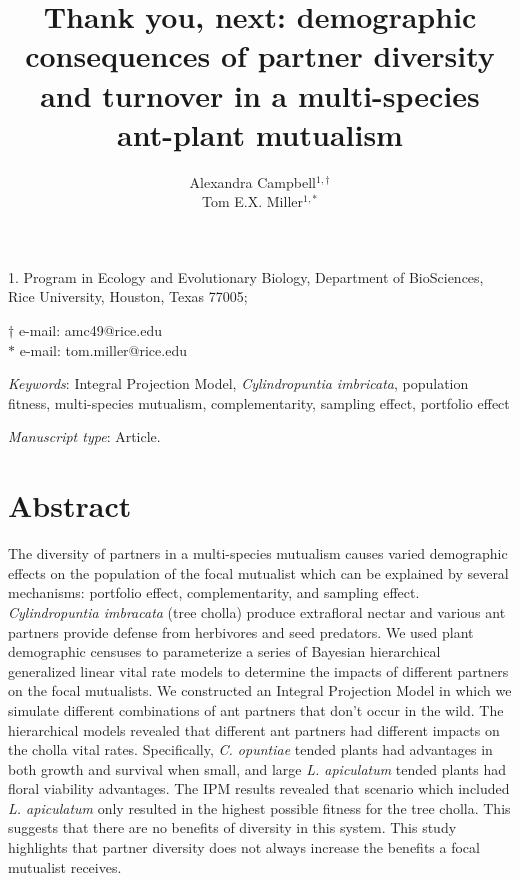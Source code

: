 \documentclass[11pt]{article}
\title{Thank you, next: demographic consequences of partner diversity and turnover in a multi-species ant-plant mutualism}
\author{Alexandra Campbell$^{1,\dagger}$ \\ 
	Tom E.X. Miller$^{1,\ast}$}
\date{}
\begin{document}
	
	\maketitle
	
	\noindent{} 1. Program in Ecology and Evolutionary Biology, Department of BioSciences, Rice University, Houston, Texas 77005;
	
	\noindent{} $\dagger$ e-mail: amc49@rice.edu\\
	\noindent{} $\ast$ e-mail: tom.miller@rice.edu
	
	\bigskip
	
	\textit{Keywords}:  Integral Projection Model, \textit{Cylindropuntia imbricata}, population fitness, multi-species mutualism, complementarity, sampling effect, portfolio effect
	
	\bigskip
	
	\textit{Manuscript type}: Article.
	
	\bigskip
	
	
\linenumbers{}
\modulolinenumbers[3]

\newpage{}

	\section*{Abstract}
The diversity of partners in a multi-species mutualism causes varied demographic effects on the population of the focal mutualist which can be explained by several mechanisms: portfolio effect, complementarity, and sampling effect.
\textit{Cylindropuntia imbracata} (tree cholla) produce extrafloral nectar and various ant partners provide defense from herbivores and seed predators. 
We used plant demographic censuses to parameterize a series of Bayesian hierarchical generalized linear vital rate models to determine the impacts of different partners on the focal mutualists. 
We constructed an Integral Projection Model in which we simulate different combinations of ant partners that don’t occur in the wild.
The hierarchical models revealed that different ant partners had different impacts on the cholla vital rates. 
Specifically, \textit{C. opuntiae} tended plants had advantages in both growth and survival when small, and large \textit{L. apiculatum} tended plants had floral viability advantages. 
The IPM results revealed that scenario which included \textit{L. apiculatum} only resulted in the highest possible fitness for the tree cholla. 
This suggests that there are no benefits of diversity in this system.
This study highlights that partner diversity does not always increase the benefits a focal mutualist receives.
\end{document}
